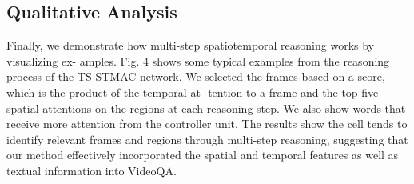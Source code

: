 \subsection{Qualitative Analysis}

Finally, we demonstrate how multi-step spatiotemporal reasoning works by visualizing ex- amples. Fig. 4 shows some typical examples from the reasoning process of the TS-STMAC network. We selected the frames based on a score, which is the product of the temporal at- tention to a frame and the top five spatial attentions on the regions at each reasoning step. We also show words that receive more attention from the controller unit. The results show the cell tends to identify relevant frames and regions through multi-step reasoning, suggesting that our method effectively incorporated the spatial and temporal features as well as textual information into VideoQA.